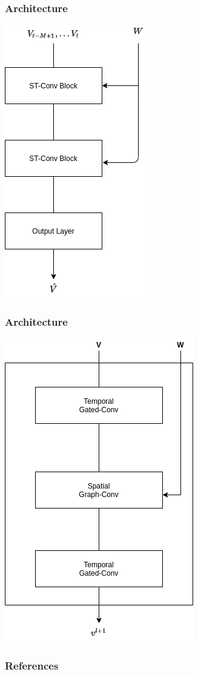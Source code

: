\documentclass{beamer}
\begin{document}
\begin{frame}
  \frametitle{Architecture}
  \centering
  \includegraphics[height=\textheight]{img/blocks.png}
\end{frame}
\begin{frame}
  \frametitle{Architecture}
  \centering
  \includegraphics[height=\textheight]{img/inner-blocks.png}
\end{frame}
\begin{frame}[allowframebreaks]
	\frametitle{References}
	\printbibliography
\end{frame}
\end{document}
